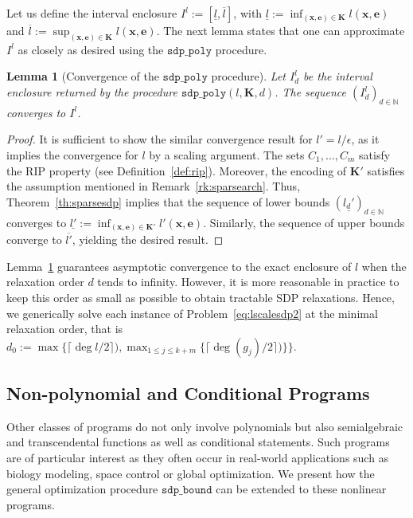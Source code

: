 \documentclass[preprint,fleqn,nocopyrightspace]{sigplanconf}
\newcommand{\N}{\mathbb{N}}
\newcommand{\x}{\mathbf{x}}
\newcommand{\e}{\mathbf{e}}
\def\K{\mathbf{K}}
\newcommand{\sdpbound}{\mathtt{sdp\_bound}}
\newcommand{\sdppolyfun}[3]{\mathtt{sdp\_poly}(#1, #2, #3)}
\newcommand{\sdppoly}{\mathtt{sdp\_poly}}
\newtheorem{lemma}[theorem]{Lemma}
\theoremstyle{plain}
\begin{document}
%
Let us define the interval enclosure $I^l := [\underline{l}, \overline{l}]$, with $\underline{l} := \inf_{(\x,\e) \in \K} l(\x,\e)$ and $\overline{l} := \sup_{(\x,\e) \in \K} l(\x,\e)$.
The next lemma states that one can approximate $I^l$ as closely as desired using the $\sdppoly$ procedure.
\begin{lemma}[Convergence of the $\sdppoly$ procedure]
\label{th:cvg_sdppoly}
Let $I_d^l$ be the interval enclosure returned by the procedure $\sdppolyfun{l}{\K}{d}$. The sequence $(I_d^l)_{d \in \N}$ converges to $I^l$.
\end{lemma}
%
\begin{proof}
It is sufficient to show the similar convergence result for $l' = l/\epsilon$, as it implies the convergence for $l$ by a scaling argument.
The sets $C_1,\dots, C_m$ satisfy the RIP property (see Definition~\ref{def:rip}). Moreover, the encoding of $\K'$ satisfies the assumption mentioned in Remark~\ref{rk:sparsearch}. Thus, Theorem~\ref{th:sparsesdp} implies that the sequence of lower bounds $(\underline{l_d'})_{d \in \N}$ converges to $\underline{l'} := \inf_{(\x,\e) \in \K'} l'(\x,\e)$. Similarly, the sequence of upper bounds converge to $\overline{l'}$, yielding the desired result.
\end{proof}
%
Lemma~\ref{th:cvg_sdppoly} guarantees asymptotic convergence to the exact enclosure of $l$ when the relaxation order $d$ tends to infinity. However, it is more reasonable in practice to keep this order as small as possible to obtain tractable SDP relaxations. Hence, we generically solve each instance of Problem~\eqref{eq:lscalesdp2} at the minimal relaxation order, that is $d_0 := \max \{\lceil \deg l / 2\rceil) , \max_{1 \leq j \leq k+m} \{ \lceil \deg (g_j) / 2\rceil) \} \}$. 
%
\subsection{Non-polynomial and Conditional Programs}
\label{sec:nonpolsdp}
Other classes of programs do not only involve polynomials but also semialgebraic and transcendental functions as well as conditional statements. Such programs are of particular interest as they often occur in real-world applications such as biology modeling, space control or global optimization. We present how the general optimization procedure $\sdpbound$ can be extended to these nonlinear programs.
%
\end{document}
